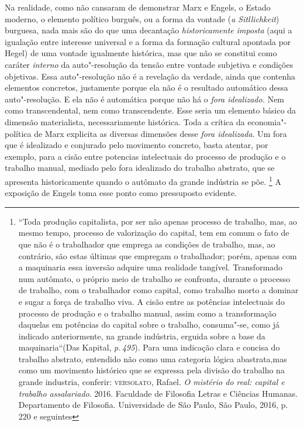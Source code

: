 Na realidade, como não cansaram de demonstrar Marx e Engels, o Estado
moderno, o elemento político burguês, ou a forma da vontade (\emph{a
Sitllichkeit}) burguesa, nada mais são do que uma decantação
\emph{historicamente imposta} (aqui a igualação entre interesse
universal e a forma da formação cultural apontada por Hegel) de uma
vontade igualmente histórica, mas que não se constitui como caráter
\emph{interno} da auto"-resolução da tensão entre vontade subjetiva e
condições objetivas. Essa auto"-resolução não é a revelação da verdade,
ainda que contenha elementos concretos, justamente porque ela não é o
resultado automático dessa auto"-resolução. E ela não é automática porque
não há o \emph{fora idealizado.} Nem como transcendental, nem como
transcendente. Esse seria um elemento básico da dimensão materialista,
necessariamente histórica. Toda a crítica da economia"-política de Marx
explicita as diversas dimensões desse \emph{fora idealizada}. Um fora
que é idealizado e conjurado pelo movimento concreto, basta atentar, por
exemplo, para a cisão entre potencias intelectuais do processo de
produção e o trabalho manual, mediado pelo fora idealizado do trabalho
abstrato, que se apresenta historicamente quando o autômato da grande
indústria se põe. \footnote{``Toda produção capitalista, por ser não
  apenas processo de trabalho, mas, ao mesmo tempo, processo de
  valorização do capital, tem em comum o fato de que não é o trabalhador
  que emprega as condições de trabalho, mas, ao contrário, são estas
  últimas que empregam o trabalhador; porém, apenas com a maquinaria
  essa inversão adquire uma realidade tangível. Transformado num
  autômato, o próprio meio de trabalho se confronta, durante o processo
  de trabalho, com o trabalhador como capital, como trabalho morto a
  dominar e sugar a força de trabalho viva. A cisão entre as potências
  intelectuais do processo de produção e o trabalho manual, assim como a
  transformação daquelas em potências do capital sobre o trabalho,
  consuma"-se, como já indicado anteriormente, na grande indústria,
  erguida sobre a base da maquinaria``(Das Kapital, \emph{p.\,495}). Para
  uma indicação clara e concisa do trabalho abstrato, entendido não como
  uma categoria lógica abastrata,mas como um movimento histórico que se
  expressa pela divisão do trabalho na grande industria, conferir:
  \textsc{versolato}, Rafael. \emph{O mistério do real: capital e trabalho
  assalariado}. 2016. Faculdade de Filosofia Letras e Ciências Humanas.
  Departamento de Filosofia. Universidade de São Paulo, São Paulo, 2016,
  p.\,220 e seguintes} A exposição de Engels toma esse ponto como
pressuposto evidente.

